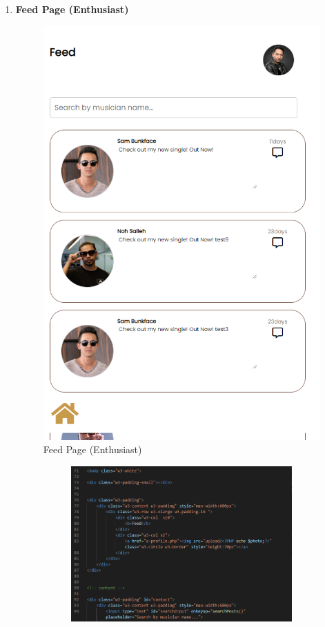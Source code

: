 \begin{enumerate}[1.]
    \item \textbf{Feed Page (Enthusiast)}
    \begin{figure}[h]
        \centering
        \includegraphics[width=0.5\linewidth]{mainmatter/images/frontend/ss/Feed (Enthusiast).png}
        \caption{Feed Page (Enthusiast)}
        \label{fig:myfig63}
    \end{figure}
    \begin{figure}[h]\ContinuedFloat
        \centering
        \begin{subfigure}[b]{0.7\textwidth}
            \centering
            \includegraphics[width=\textwidth]{mainmatter/images/frontend/code/efeed.png}
            \label{fig:sub1}
        \end{subfigure}
        \hspace{0.04\textwidth}

\end{figure}
\end{enumerate}
